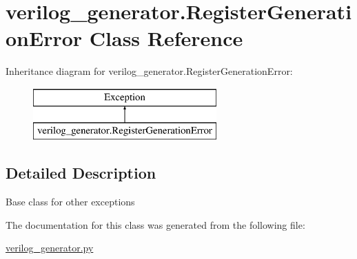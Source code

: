 \hypertarget{classverilog__generator_1_1RegisterGenerationError}{\section{verilog\-\_\-generator.\-Register\-Generation\-Error Class Reference}
\label{classverilog__generator_1_1RegisterGenerationError}
}
Inheritance diagram for verilog\-\_\-generator.\-Register\-Generation\-Error\-:\begin{figure}[H]
\begin{center}
\leavevmode
\includegraphics[height=2.000000cm]{classverilog__generator_1_1RegisterGenerationError}
\end{center}
\end{figure}


\subsection{Detailed Description}
\begin{DoxyVerb}Base class for other exceptions\end{DoxyVerb}
 

The documentation for this class was generated from the following file\-:\begin{DoxyCompactItemize}
\item 
\hyperlink{verilog__generator_8py}{verilog\-\_\-generator.\-py}\end{DoxyCompactItemize}
